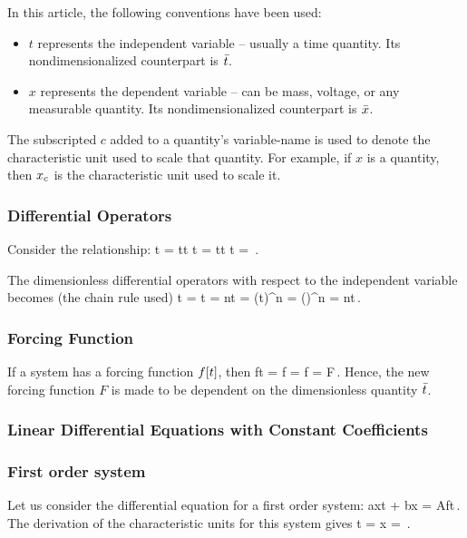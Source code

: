 In this article, the following conventions have been used:
\begin{itemize}
\item $t$ represents the independent variable -- usually a time quantity. Its nondimensionalized counterpart is $\bar{t}$.
\item $x$ represents the dependent variable -- can be mass, voltage, or any measurable quantity. Its nondimensionalized counterpart is $\bar{x}$.
\end{itemize}

The subscripted $c$ added to a quantity's variable-name is used to denote the characteristic unit used to scale that quantity. For example, if $x$ is a quantity, then ${x}_{c}$ is the characteristic unit used to scale it.


\subsubsection{Differential Operators}
Consider the relationship:
\beq
              t = \scpq t\chpq t \implies \dx t = \chpq t\dx\scpq t \implies 
{} t = \,.
\eeq

The dimensionless differential operators with respect to the independent variable becomes (the chain rule used)
\beq
\xod{}t  =  t = 
\implies \nxod n{}t = \left(\xod{}t\right)^n
                    = \left(\right)^n
                    = \nxod n{}{\scpq t}\,.
\eeq


\subsubsection{Forcing Function}
If a system has a forcing function $f\!\left[{t}\right]$, then
\beq
f\vat t = f = f = F\,.
\eeq
Hence, the new forcing function $F$ is made to be dependent on the dimensionless quantity $\bar{t}$.

\subsubsection{Linear Differential Equations with Constant Coefficients}

\subsubsection{First order system}
Let us consider the differential equation for a first order system:
\beq
a\xod xt + bx = Af\vat t\,.
\eeq
The derivation of the characteristic units for this system gives
\beq
\chpq t = \qquad{}\qquad\chpq x =  \,.
\eeq



